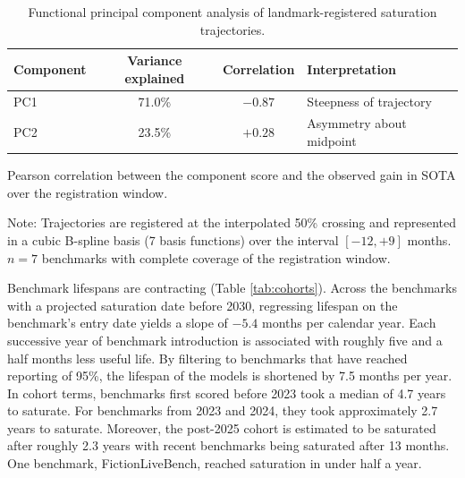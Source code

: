 \begin{table}[t]
\centering
\begin{threeparttable}
\caption{Functional principal component analysis of landmark-registered saturation trajectories.}
\label{tab:fpca}
{\setlength{\tabcolsep}{3pt}\footnotesize
\begin{tabular}{lccl}
\toprule
Component & Variance explained & Correlation\tnote{a} & Interpretation \\
\midrule
PC1 & 71.0\% & $-0.87$ & Steepness of trajectory \\
PC2 & 23.5\% & $+0.28$ & Asymmetry about midpoint \\
\bottomrule
\end{tabular}%
}
\begin{tablenotes}
\footnotesize
\item[a] Pearson correlation between the component score and the observed gain in SOTA over the registration window.
\item Note: Trajectories are registered at the interpolated 50\% crossing and represented in a cubic B-spline basis (7 basis functions) over the interval $[-12, +9]$ months. $n = 7$ benchmarks with complete coverage of the registration window.
\end{tablenotes}
\end{threeparttable}
\end{table}

Benchmark lifespans are contracting (Table \ref{tab:cohorts}). Across the benchmarks with a projected saturation date before 2030, regressing lifespan on the benchmark's entry date yields a slope of $-5.4$ months per calendar year. Each successive year of benchmark introduction is associated with roughly five and a half months less useful life. By filtering to benchmarks that have reached reporting of 95\%, the lifespan of the models is shortened by 7.5 months per year. In cohort terms, benchmarks first scored before 2023 took a median of 4.7 years to saturate. For benchmarks from 2023 and 2024, they took approximately 2.7 years to saturate. Moreover, the post-2025 cohort is estimated to be saturated after roughly 2.3 years with recent benchmarks being saturated after 13 months. One benchmark, FictionLiveBench, reached saturation in under half a year.

